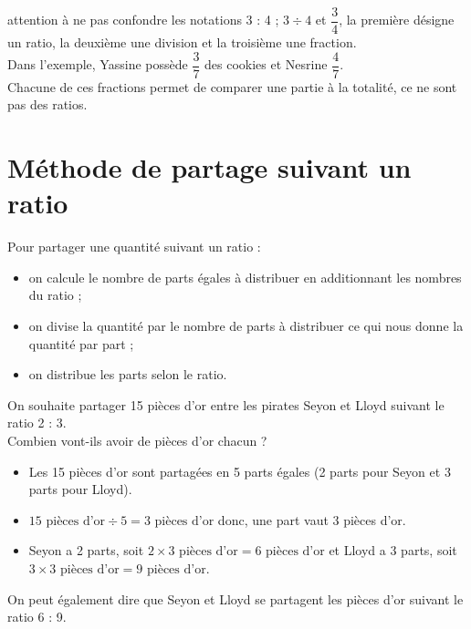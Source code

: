 \begin{remarque}
   attention à ne pas confondre les notations 3 : 4 ; $3\div4$ et $\dfrac34$, la première désigne un ratio, la deuxième une division et la troisième une fraction. \\
   Dans l'exemple, Yassine possède $\dfrac37$ des cookies et Nesrine $\dfrac47$. \\ [1mm]
   Chacune de ces fractions permet de comparer une partie à la totalité, ce ne sont pas des ratios.
\end{remarque}


\section{Méthode de partage suivant un ratio}

\begin{methode}
Pour partager une quantité suivant un ratio :
   \begin{itemize}
      \item on calcule le nombre de parts égales à distribuer en additionnant les nombres du ratio ;
      \item on divise la quantité par le nombre de parts à distribuer ce qui nous donne la quantité par part ;
      \item on distribue les parts selon le ratio.
   \end{itemize}
   \exercice
   On souhaite partager 15 pièces d'or entre les pirates Seyon et Lloyd suivant le ratio 2 : 3. \\
   Combien vont-ils avoir de pièces d'or chacun ?
   \correction
   \ \\ [-10mm]
   \begin{itemize}
      \item Les 15 pièces d'or sont partagées en 5 parts égales (2 parts pour Seyon et 3 parts pour Lloyd).
      \item $15\text{ pièces d'or}\div 5 =3\text{ pièces d'or}$ donc, une part vaut 3 pièces d'or.
     \item Seyon a 2 parts, soit $2\times3\text{ pièces d'or} =6\text{ pièces d'or}$ et Lloyd a 3 parts, soit $3\times3\text{ pièces d'or} =9\text{ pièces d'or}$. 
   \end{itemize}
   On peut également dire que Seyon et Lloyd se partagent les pièces d'or suivant le ratio 6 : 9.
\end{methode}


\exercicesbase

